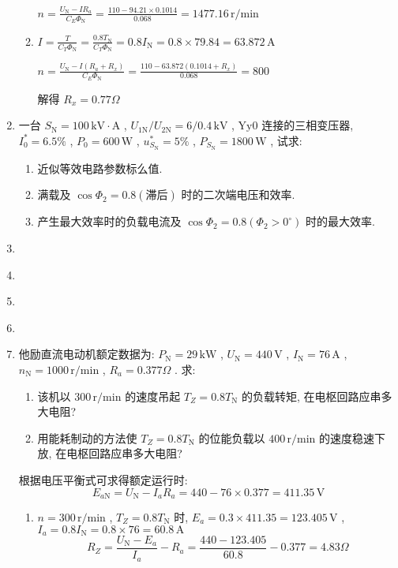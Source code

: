 \documentclass[lang=cn,11pt,marginpar=margintrue]{elegantbook}%
\newcommand{\zt}[1]{\,\mathrm{#1}}
\newcommand{\NN}{\mathrm{N}}
\begin{document}
\begin{enumerate}
\begin{solution}
\begin{enumerate}
					$n=\frac{U_{\NN}-IR_a}{C_E \varPhi_{\NN}}=\frac{110-94.21\times 0.1014}{0.068}=1477.16\zt{r/min}$
				\item $I=\frac{T}{C_T \varPhi_{\NN}}=\frac{0.8T_{\NN}}{C_T \varPhi_{\NN}}=0.8I_{\NN}=0.8\times 79.84=63.872\zt{A}$
				
				$n=\frac{U_{\NN}-I(R_a+R_x)}{C_E \varPhi_{\NN}}=\frac{110-63.872(0.1014+R_x)}{0.068}=800$

				解得 $R_x=0.77\Omega$
			\end{enumerate}
		\end{solution}
	\item \label{js:5}一台 $S_{\NN}=100\zt{kV\cdot A}$ , $U_{1\NN}/U_{2\NN}=6/0.4\zt{kV}$ , $\mathrm{Yy}0$ 连接的三相变压器, $I_0^*=6.5\% $ , $P_0=600\zt{W}$ , $u_{S_{\NN}}^*=5\%$ , $P_{S_{\NN}}=1800\zt{W}$ , 试求:
	\begin{enumerate}
		\item 近似等效电路参数标么值.
		\item 满载及 $\cos\varPhi_2=0.8(\text{滞后})$ 时的二次端电压和效率.
		\item 产生最大效率时的负载电流及 $\cos\varPhi_2=0.8(\varPhi_2>0^\circ)$ 时的最大效率.
	\end{enumerate}
	\item \label{js:6}
	\item \label{js:7}
	\item \label{js:8}
	\item \label{js:9}
	


	\item \label{js:10}他励直流电动机额定数据为: $P_{\NN}=29\zt{kW}$ , $U_{\NN}=440\zt{V}$ , $I_{\NN}=76\zt{A}$ , $n_{\NN}=1000\zt{r/min}$ , $R_a=0.377\Omega$ . 求:
	\begin{enumerate}
		\item 该机以 $300\zt{r/min}$ 的速度吊起 $T_Z=0.8T_{\NN}$ 的负载转矩, 在电枢回路应串多大电阻?
		\item 用能耗制动的方法使 $T_Z=0.8T_{\NN}$ 的位能负载以 $400\zt{r/min}$ 的速度稳速下放, 在电枢回路应串多大电阻?
	\end{enumerate}
	\begin{solution}
		根据电压平衡式可求得额定运行时:
		\begin{equation*}
			E_{a\NN}=U_{\NN}-I_aR_a=440-76\times 0.377=411.35\zt{V}
		\end{equation*}
		\begin{enumerate}
			\item $n=300\zt{r/min}$ , $T_Z=0.8T_{\NN}$ 时, $E_a=0.3\times 411.35=123.405\zt{V}$ , $I_a=0.8I_{\NN}=0.8\times 76=60.8\zt{A}$
				\begin{equation*}
					R_Z=\frac{U_{\NN}-E_a}{I_a}-R_a=\frac{440-123.405}{60.8}-0.377=4.83\Omega
				\end{equation*}
		\end{enumerate}
	\end{solution}






\end{enumerate}
\end{document}
